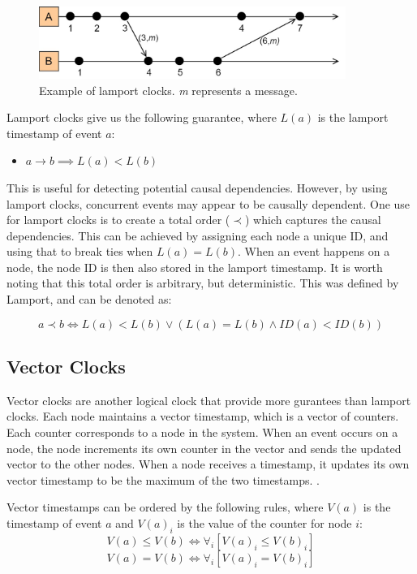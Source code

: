 \documentclass[12pt]{report}
\begin{document}
\begin{figure}
    \centering
    \includegraphics[width=10cm]{images/LamportClocks.jpg}
    \caption{Example of lamport clocks. \textit{m} represents a message.}
    \label{fig:lamport}
\end{figure}

Lamport clocks give us the following guarantee, where $L(a)$ is the lamport timestamp of event $a$: 
\begin{itemize}
    \item $a \rightarrow b \implies  L(a) < L(b)$
\end{itemize}
This is useful for detecting potential causal dependencies. However, by using lamport clocks, concurrent events may appear to be causally dependent. One use for lamport clocks is to create a total order ($\prec$) which captures the causal dependencies. This can be achieved by assigning each node a unique ID, and using that to break ties when $L(a) = L(b)$. When an event happens on a node, the node ID is then also stored in the lamport timestamp. It is worth noting that this total order is arbitrary, but deterministic. This was defined by Lamport\cite{lamport1978time}, and can be denoted as:\par
\[a \prec b \iff L(a) < L(b) \lor (L(a) = L(b) \land ID(a) < ID(b))\]

\subsection{Vector Clocks}
Vector clocks are another logical clock that provide more gurantees than lamport clocks. Each node maintains a vector timestamp, which is a vector of counters. Each counter corresponds to a node in the system.
When an event occurs on a node, the node increments its own counter in the vector and sends the updated vector to the other nodes.
When a node receives a timestamp, it updates its own vector timestamp to be the maximum of the two timestamps. \cite{mattern1989virtual}.\par

Vector timestamps can be ordered by the following rules, where $V(a)$ is the timestamp of event $a$ and $V(a)_i$ is the value of the counter for node $i$:
\[V(a) \leq V(b) \iff \forall_i [V(a)_i \leq V(b)_i]  \]
\[V(a) = V(b) \iff \forall_i [V(a)_i = V(b)_i]\]
\end{document}
